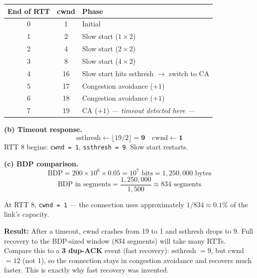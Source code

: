 \documentclass[11pt, letterpaper]{article}
\begin{document}
\begin{center}
\renewcommand{\arraystretch}{1.3}
\begin{tabular}{ccl}
\toprule
\textbf{End of RTT} & \textbf{cwnd} & \textbf{Phase} \\
\midrule
0 & 1  & Initial \\
1 & 2  & Slow start ($1\times2$) \\
2 & 4  & Slow start ($2\times2$) \\
3 & 8  & Slow start ($4\times2$) \\
4 & 16 & Slow start hits ssthresh $\to$ switch to CA \\
5 & 17 & Congestion avoidance ($+1$) \\
6 & 18 & Congestion avoidance ($+1$) \\
7 & 19 & CA ($+1$) \quad \textit{--- timeout detected here ---} \\
\bottomrule
\end{tabular}
\end{center}

\textbf{(b) Timeout response.}
\[\text{ssthresh} \leftarrow \lfloor 19/2 \rfloor = \mathbf{9} \quad\text{cwnd} \leftarrow \mathbf{1}\]
RTT 8 begins: \texttt{cwnd = 1}, \texttt{ssthresh = 9}. Slow start restarts.

\textbf{(c) BDP comparison.}
\[\text{BDP} = 200\times10^6 \times 0.05 = 10^7 \text{ bits} = 1{,}250{,}000 \text{ bytes}\]
\[\text{BDP in segments} = \frac{1{,}250{,}000}{1{,}500} \approx 834 \text{ segments}\]

At RTT 8, \texttt{cwnd = 1} --- the connection uses approximately $1/834 \approx 0.1\%$
of the link's capacity.

\begin{tcolorbox}[colback=part3bg, colframe=sectionpurple, arc=3pt, boxrule=1pt]
\textbf{Result:} After a timeout, cwnd crashes from 19 to 1 and ssthresh drops to 9.
Full recovery to the BDP-sized window (834 segments) will take many RTTs. Compare this
to a \textbf{3 dup-ACK} event (fast recovery): ssthresh $= 9$, but cwnd $= 12$ (not 1),
so the connection stays in congestion avoidance and recovers much faster. This is exactly
why fast recovery was invented.
\end{tcolorbox}

\vspace{8pt}
\end{document}
